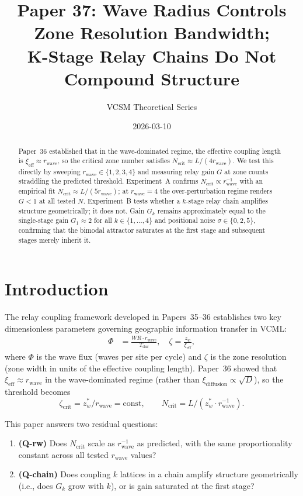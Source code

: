 \documentclass[11pt]{article}
\title{\textbf{Paper 37: Wave Radius Controls Zone Resolution Bandwidth;\\
K-Stage Relay Chains Do Not Compound Structure}}
\author{VCSM Theoretical Series}
\date{2026-03-10}
\begin{document}
\maketitle

\begin{abstract}
Paper~36 established that in the wave-dominated regime, the effective coupling
length is $\xi_\mathrm{eff} \approx r_\mathrm{wave}$, so the critical zone number
satisfies $N_\mathrm{crit} \approx L/(4r_\mathrm{wave})$.
We test this directly by sweeping $r_\mathrm{wave} \in \{1,2,3,4\}$ and measuring
relay gain $G$ at zone counts straddling the predicted threshold.
Experiment~A confirms $N_\mathrm{crit} \propto r_\mathrm{wave}^{-1}$ with an
empirical fit $N_\mathrm{crit} \approx L/(5r_\mathrm{wave})$; at $r_\mathrm{wave}=4$
the over-perturbation regime renders $G<1$ at all tested $N$.
Experiment~B tests whether a $k$-stage relay chain amplifies structure
geometrically; it does not. Gain $G_k$ remains approximately equal to the
single-stage gain $G_1 \approx 2$ for all $k \in \{1,\ldots,4\}$ and positional
noise $\sigma \in \{0,2,5\}$, confirming that the bimodal attractor saturates at
the first stage and subsequent stages merely inherit it.
\end{abstract}

\section{Introduction}

The relay coupling framework developed in Papers~35--36 establishes two key
dimensionless parameters governing geographic information transfer in VCML:
\begin{align}
  \Phi &= \frac{WR \cdot r_\mathrm{wave}}{T_\mathrm{dur}}, \quad
  \zeta = \frac{z_w}{\xi_\mathrm{eff}},
\end{align}
where $\Phi$ is the wave flux (waves per site per cycle) and $\zeta$ is the zone
resolution (zone width in units of the effective coupling length).
Paper~36 showed that $\xi_\mathrm{eff} \approx r_\mathrm{wave}$ in the
wave-dominated regime (rather than $\xi_\mathrm{diffusion} \propto \sqrt{D}$),
so the threshold becomes
\begin{equation}
  \zeta_\mathrm{crit} = z_w^* / r_\mathrm{wave} = \text{const},
  \qquad
  N_\mathrm{crit} = L / (z_w^* \cdot r_\mathrm{wave}^{-1}).
\end{equation}

This paper answers two residual questions:
\begin{enumerate}
  \item \textbf{(Q-rw)} Does $N_\mathrm{crit}$ scale as $r_\mathrm{wave}^{-1}$
        as predicted, with the same proportionality constant across all tested
        $r_\mathrm{wave}$ values?
  \item \textbf{(Q-chain)} Does coupling $k$ lattices in a chain amplify
        structure geometrically (i.e., does $G_k$ grow with $k$), or is gain
        saturated at the first stage?
\end{enumerate}
\end{document}
